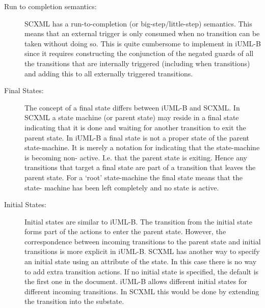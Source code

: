 \begin{description}

\item [Run to completion semantics:] SCXML has a run-to-completion 
(or big-step/little-step) semantics. This means that an external 
trigger is only consumed when no transition can be taken without 
doing so. This is quite cumbersome to implement in iUML-B since 
it requires constructing the conjunction of the negated guards of
all the transitions that are internally triggered (including when 
transitions) and adding this to all externally triggered transitions.

\item [Final States:]
The concept of a final state differs between iUML-B and 
SCXML. In SCXML a state machine (or parent state) may 
reside in a final state indicating that it is done and 
waiting for another transition to exit the parent 
state.  In iUML-B a final state is not a proper state 
of the parent state-machine. It is merely a notation 
for indicating that the state-machine is becoming non-
active. I.e. that the parent state is exiting. Hence 
any transitions that target a final state are part of a 
transition that leaves the parent state. For a `root' 
state-machine the final state means that the state-
machine has been left completely and no state is active.

\item [Initial States:]
Initial states are similar to iUML-B. The transition 
from the initial state forms part of the actions to 
enter the parent state. However, the correspondence 
between incoming transitions to the parent state and 
initial transitions is more explicit in iUML-B. 
SCXML has another way to specify an initial state using 
an attribute of the state. In this case there is no way 
to add extra transition actions.
If no initial state is specified, the default is the 
first one in the document.
iUML-B allows different initial states for different 
incoming transitions. In SCXML this would be done by 
extending the transition into the substate.



\end{description}



